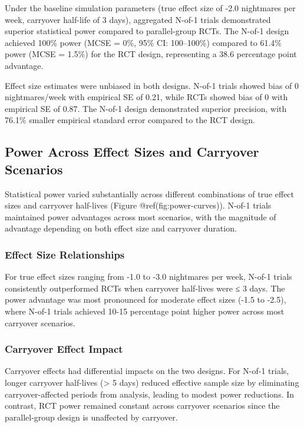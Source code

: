 \documentclass[
  11pt,
]{article}
\begin{document}
Under the baseline simulation parameters (true effect size of -2.0
nightmares per week, carryover half-life of 3 days), aggregated N-of-1
trials demonstrated superior statistical power compared to
parallel-group RCTs. The N-of-1 design achieved 100\% power (MCSE = 0\%,
95\% CI: 100--100\%) compared to 61.4\% power (MCSE = 1.5\%) for the RCT
design, representing a 38.6 percentage point advantage.

Effect size estimates were unbiased in both designs. N-of-1 trials
showed bias of 0 nightmares/week with empirical SE of 0.21, while RCTs
showed bias of 0 with empirical SE of 0.87. The N-of-1 design
demonstrated superior precision, with 76.1\% smaller empirical standard
error compared to the RCT design.

\subsection{Power Across Effect Sizes and Carryover
Scenarios}\label{power-across-effect-sizes-and-carryover-scenarios}

Statistical power varied substantially across different combinations of
true effect sizes and carryover half-lives (Figure
@ref(fig:power-curves)). N-of-1 trials maintained power advantages
across most scenarios, with the magnitude of advantage depending on both
effect size and carryover duration.

\subsubsection{Effect Size
Relationships}\label{effect-size-relationships}

For true effect sizes ranging from -1.0 to -3.0 nightmares per week,
N-of-1 trials consistently outperformed RCTs when carryover half-lives
were ≤ 3 days. The power advantage was most pronounced for moderate
effect sizes (-1.5 to -2.5), where N-of-1 trials achieved 10-15
percentage point higher power across most carryover scenarios.

\subsubsection{Carryover Effect Impact}\label{carryover-effect-impact}

Carryover effects had differential impacts on the two designs. For
N-of-1 trials, longer carryover half-lives (\textgreater{} 5 days)
reduced effective sample size by eliminating carryover-affected periods
from analysis, leading to modest power reductions. In contrast, RCT
power remained constant across carryover scenarios since the
parallel-group design is unaffected by carryover.
\end{document}
